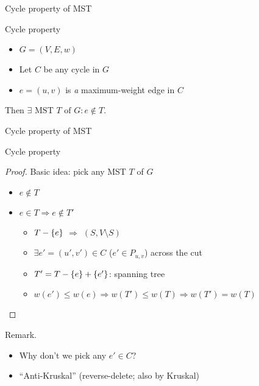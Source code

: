 \begin{frame}{Cycle property of MST}
  \begin{block}{Cycle property }
	\begin{itemize}
	  \item $G = (V,E,w)$
	  \item Let $C$ be any cycle in $G$
	  \item $e = (u,v)$ is \emph{a} maximum-weight edge in $C$
	\end{itemize}
	Then $\exists \textrm{ MST } T \text{ of } G: e \notin T$.
  \end{block}

\end{frame}
\begin{frame}{Cycle property of MST}
  \begin{block}{Cycle property }
    \begin{proof}
      Basic idea: pick any MST $T$ of $G$
      \begin{itemize}
	\item $e \notin T$
	\item $e \in T \Rightarrow e \notin T'$
	  \begin{itemize}
	    \item $T - \{e\}$ $\Rightarrow$ $(S, V \setminus S)$
	    \item $\exists e' = (u', v') \in C$ ($e' \in P_{u,v}$) across the cut
	    \item \textcolor{red}{$T' = T - \{e\} + \{e'\}$}: spanning tree
	    \item $w(e') \leq w(e) \Rightarrow w(T') \leq w(T) \Rightarrow w(T') = w(T)$
	  \end{itemize}
      \end{itemize}
    \end{proof}
  \end{block}

  \begin{alertblock}{Remark.}
    \begin{itemize}
      \item Why don't we pick any $e' \in C$?
      \item ``Anti-Kruskal'' (reverse-delete; also by Kruskal) 
    \end{itemize}
  \end{alertblock}
\end{frame}
